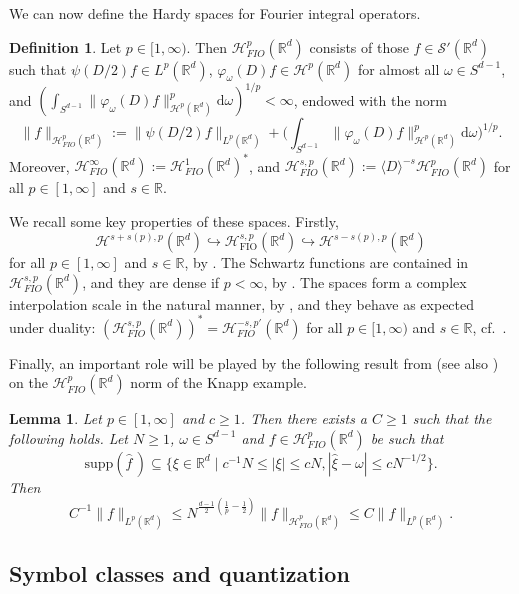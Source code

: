 \documentclass{amsart}
\numberwithin{equation}{section}
\newtheorem{lemma}[theorem]{Lemma}
\theoremstyle{definition}
\newtheorem{definition}[theorem]{Definition}
\newcommand{\R}{\mathbb{R}}
\newcommand{\Rd}{\mathbb{R}^{d}}
\newcommand{\Rn}{\mathbb{R}^{d}}
\newcommand {\HT}{\mathcal{H}}
\newcommand {\Hp}{\mathcal{H}^{p}_{FIO}(\R^d)}
\newcommand {\Hps}{\mathcal{H}^{s,p}_{FIO}(\R^d)}
\newcommand {\ud}{\mathrm{d}}
\newcommand {\ph}{\varphi}
\newcommand {\Sw}{\mathcal{S}}
\newcommand {\supp}{\mathrm{supp}}
\newcommand {\w}{\omega}
\newcommand {\wh}{\widehat}
\newcommand {\rb}{\rangle}
\newcommand {\lb}{\langle}
\begin{document}
We can now define the Hardy spaces for Fourier integral operators.

\begin{definition}\label{def:HpFIO}
Let $p\in[1,\infty)$. Then $\Hp$ consists of those $f\in\Sw'(\Rn)$ such that $\psi(D/2)f\in L^{p}(\Rd)$, $\ph_{\w}(D)f\in \HT^{p}(\Rd)$ for almost all $\w\in S^{d-1}$, and $(\int_{S^{d-1}}\|\ph_{\w}(D)f\|_{\HT^{p}(\Rd)}^{p}\ud \w)^{1/p}<\infty$, endowed with the norm
\[
\|f\|_{\Hp}:=\|\psi(D/2)f\|_{L^{p}(\Rd)}+\Big(\int_{S^{d-1}}\|\ph_{\w}(D)f\|_{\HT^{p}(\Rd)}^{p}\ud \w\Big)^{1/p}.
\] 
Moreover, $\HT^{\infty}_{FIO}(\Rd):=\HT^{1}_{FIO}(\Rd)^{*}$, and $\HT^{s,p}_{FIO}(\Rd):=\lb D\rb^{-s}\Hp$ for all $p\in[1,\infty]$ and $s\in\R$.
\end{definition}

We recall some key properties of these spaces. Firstly,
\begin{equation}\label{eq:Sobolev}
\mathcal{H}^{s+s(p),p}(\R^d) \hookrightarrow \mathcal{H}^{s,p}_{\text{FIO}}(\R^d) \hookrightarrow \mathcal{H}^{s-s(p),p}(\R^d)
\end{equation}
for all $p\in[1,\infty]$ and $s\in\R$, by \cite[Theorem~7.4]{HassellPortalRozendaal2020}.  The Schwartz functions are contained in $\Hps$, and they are dense if $p<\infty$, by \cite[Proposition 6.6]{HassellPortalRozendaal2020}. The spaces form a complex interpolation scale in the natural manner, by \cite[Proposition 6.7]{HassellPortalRozendaal2020},  
and they behave as expected under duality:
$(\Hps)^{*}=\HT^{-s,p'}_{FIO}(\Rn)$ 
for all $p\in[1,\infty)$ and $s\in\R$, cf.~\cite[Proposition 6.8]{HassellPortalRozendaal2020}.

Finally, an important role will be played by the following result from \cite[Proposition 6.4]{FaLiRoSo23} (see also \cite[Lemma 2.2]{Rozendaal22b}) on the $\Hp$ norm of the Knapp example.

\begin{lemma}\label{lem:Knapp}
Let $p\in[1,\infty]$ and $c\geq 1$. Then there exists a $C\geq 1$ such that the following holds. Let $N\geq 1$, $\w\in S^{d-1}$ and $f\in\Hp$ be such that
\[
\supp(\wh{f}\,)\subseteq\{\xi\in\Rd\mid c^{-1}N\leq |\xi|\leq cN, |\hat{\xi}-\w|\leq cN^{-1/2}\}.
\]
Then
\[
C^{-1}\|f\|_{L^{p}(\Rd)}\leq N^{\frac{d-1}{2}(\frac{1}{p}-\frac{1}{2})}\|f\|_{\Hp}\leq C\|f\|_{L^{p}(\Rd)}.
\]
\end{lemma}



\subsection{Symbol classes and quantization}\label{subsec:symbols}
\end{document}
